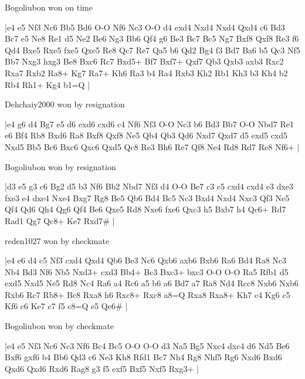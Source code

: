 \showboard

Bogoliubon won on time

\makegametitle
|e4 e5 Nf3 Nc6 Bb5 Bd6 O-O Nf6 Nc3 O-O d4 exd4 Nxd4 Nxd4 Qxd4 c6 Bd3 Bc7 e5 Ne8 Re1 d5 Ne2 Be6 Ng3 Bb6 Qf4 g6 Be3 Bc7 Bc5 Ng7 Bxf8 Qxf8 Re3 f6 Qd4 Bxe5 Rxe5 fxe5 Qxe5 Re8 Qc7 Re7 Qa5 b6 Qd2 Bg4 f3 Bd7 Ba6 b5 Qc3 Nf5 Bb7 Nxg3 hxg3 Be8 Bxc6 Rc7 Bxd5+ Bf7 Bxf7+ Qxf7 Qb3 Qxb3 axb3 Rxc2 Rxa7 Rxb2 Ra8+ Kg7 Ra7+ Kh6 Ra3 b4 Ra4 Rxb3 Kh2 Rb1 Kh3 b3 Kh4 b2 Rb4 Rh1+ Kg4 b1=Q  |

\showboard

Dehchaiy2000 won by resignation

\makegametitle
|e4 g6 d4 Bg7 e5 d6 exd6 cxd6 c4 Nf6 Nf3 O-O Nc3 b6 Bd3 Bb7 O-O Nbd7 Re1 e6 Bf4 Rb8 Bxd6 Ra8 Bxf8 Qxf8 Ne5 Qb4 Qb3 Qd6 Nxd7 Qxd7 d5 exd5 cxd5 Nxd5 Bb5 Bc6 Bxc6 Qxc6 Qxd5 Qc8 Re3 Bh6 Re7 Qf8 Ne4 Rd8 Rd7 Re8 Nf6+  |

\showboard

Bogoliubon won by resignation

\makegametitle
|d3 e5 g3 c6 Bg2 d5 b3 Nf6 Bb2 Nbd7 Nf3 d4 O-O Be7 c3 c5 cxd4 cxd4 e3 dxe3 fxe3 e4 dxe4 Nxe4 Bxg7 Rg8 Be5 Qb6 Bd4 Bc5 Nc3 Bxd4 Nxd4 Nxc3 Qf3 Ne5 Qf4 Qd6 Qh4 Qg6 Qf4 Be6 Qxe5 Rd8 Nxe6 fxe6 Qxc3 h5 Bxb7 h4 Qc6+ Rd7 Rad1 Qg7 Qc8+ Ke7 Rxd7\#  |

\showboard

reden1027 won by checkmate

\makegametitle
|e4 e6 d4 c5 Nf3 cxd4 Qxd4 Qb6 Be3 Nc6 Qxb6 axb6 Bxb6 Ra6 Bd4 Ra8 Nc3 Nb4 Bd3 Nf6 Nb5 Nxd3+ cxd3 Bb4+ Bc3 Bxc3+ bxc3 O-O O-O Ra5 Rfb1 d5 exd5 Nxd5 Ne5 Rd8 Nc4 Ra6 a4 Rc6 a5 b6 a6 Bd7 a7 Ra8 Nd4 Rcc8 Nxb6 Nxb6 Rxb6 Rc7 Rb8+ Bc8 Rxa8 h6 Rxc8+ Rxc8 a8=Q Rxa8 Rxa8+ Kh7 c4 Kg6 c5 Kf6 c6 Ke7 c7 f5 c8=Q e5 Qe6\#  |

\showboard

Bogoliubon won by checkmate

\makegametitle
|e4 e5 Nf3 Nc6 Nc3 Nf6 Bc4 Bc5 O-O O-O d3 Na5 Bg5 Nxc4 dxc4 d6 Nd5 Be6 Bxf6 gxf6 b4 Bb6 Qd3 c6 Ne3 Kh8 Rfd1 Bc7 Nh4 Rg8 Nhf5 Rg6 Nxd6 Bxd6 Qxd6 Qxd6 Rxd6 Rag8 g3 f5 exf5 Bxf5 Nxf5 Rxg3+  |

